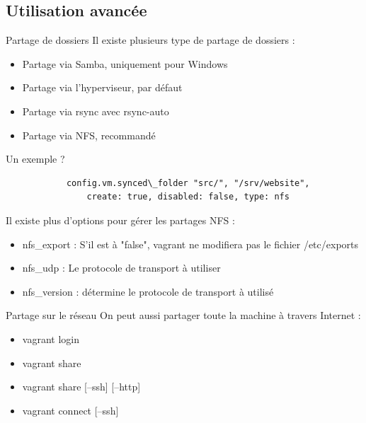 \documentclass{beamer}
\begin{document}
    \subsection{Utilisation avancée}
    \begin{frame}{Partage de dossiers}
        Il existe plusieurs type de partage de dossiers :
        \begin{itemize}
            \item{Partage via Samba, uniquement pour Windows}
            \item{Partage via l'hyperviseur, par défaut}
            \item{Partage via rsync avec rsync-auto}
            \item{Partage via NFS, recommandé}
        \end{itemize}
    \end{frame}

    \begin{frame}[containsverbatim]{Un exemple ?}
        \begin{verbatim}
            config.vm.synced\_folder "src/", "/srv/website",
                create: true, disabled: false, type: nfs
            \end{verbatim}
            Il existe plus d'options pour gérer les partages NFS :
            \begin{itemize}
                \item{nfs\_export : S'il est à "false", vagrant ne modifiera pas le fichier /etc/exports}
                \item{nfs\_udp : Le protocole de transport à utiliser}
                \item{nfs\_version : détermine le protocole de transport à utilisé}
            \end{itemize}
        \end{frame}
        

    \begin{frame}{Partage sur le réseau}
        On peut aussi partager toute la machine à travers Internet :
        \begin{itemize}
            \item{vagrant login}
            \item{vagrant share}
            \item{vagrant share [--ssh] [--http]}
            \item{vagrant connect [--ssh]}
        \end{itemize}
    \end{frame}
\end{document}
